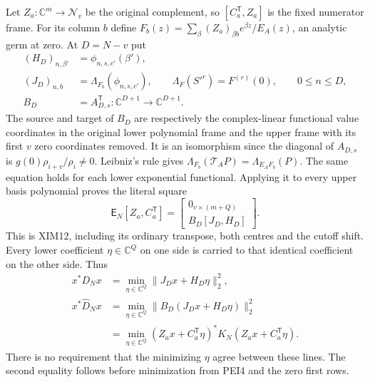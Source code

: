 Let $Z_a:\mathbb C^m\to\mathscr N_v$ be the original complement,
so $[C_a^{\mathsf T},Z_a]$ is the fixed numerator frame. For its
column $b$ define
$F_b(z)=\sum_\beta (Z_a)_{\beta b}e^{\beta z}/E_A(z)$,
an analytic germ at zero. At $D=N-v$ put
\[
 \begin{split}
 (H_D)_{n,\beta'}&=\phi_{n,s,c'}(\beta'),\\
 (J_D)_{n,b}&=\Lambda_{F_b}(\phi_{n,s,c'}),\qquad
      \Lambda_F(S'^r)=F^{(r)}(0),\qquad 0\le n\le D,\\
 B_D&=A_{D,s}^{\mathsf T}:\mathbb C^{D+1}\longrightarrow
                         \mathbb C^{D+1}.
 \end{split}                                                     \tag{PEI3}
\]
The source and target of $B_D$ are respectively the complex-linear
functional value coordinates in the original lower polynomial frame
and the upper frame with its first $v$ zero coordinates removed.
It is an isomorphism since the diagonal of $A_{D,s}$ is
$g(0)\rho_{i+v}/\rho_i\ne0$.
Leibniz's rule gives
$\Lambda_{F_b}(\mathcal T_AP)=\Lambda_{E_AF_b}(P)$.
The same equation holds for each lower exponential functional.
Applying it to every upper basis polynomial proves the literal square
\[
 \mathsf E_N[Z_a,C_a^{\mathsf T}]
   =\begin{bmatrix}
       0_{v\times(m+Q)}\\
       B_D[J_D,H_D]
     \end{bmatrix}.                                             \tag{PEI4}
\]
This is XIM12, including its ordinary transpose, both centres and the
cutoff shift. Every lower coefficient $\eta\in\mathbb C^Q$ on one side
is carried to that identical coefficient on the other side. Thus
\[
 \begin{split}
 x^*D_Nx&=\min_{\eta\in\mathbb C^Q}
                          \|J_Dx+H_D\eta\|_2^2,\\
 x^*\widehat D_Nx&=\min_{\eta\in\mathbb C^Q}
                          \|B_D(J_Dx+H_D\eta)\|_2^2\\
 &=\min_{\eta\in\mathbb C^Q}
                  (Z_ax+C_a^{\mathsf T}\eta)^*K_N
                         (Z_ax+C_a^{\mathsf T}\eta).
 \end{split}                                                     \tag{PEI5}
\]
There is no requirement that the minimizing $\eta$ agree between
these lines. The second equality follows before minimization from
PEI4 and the zero first rows.

